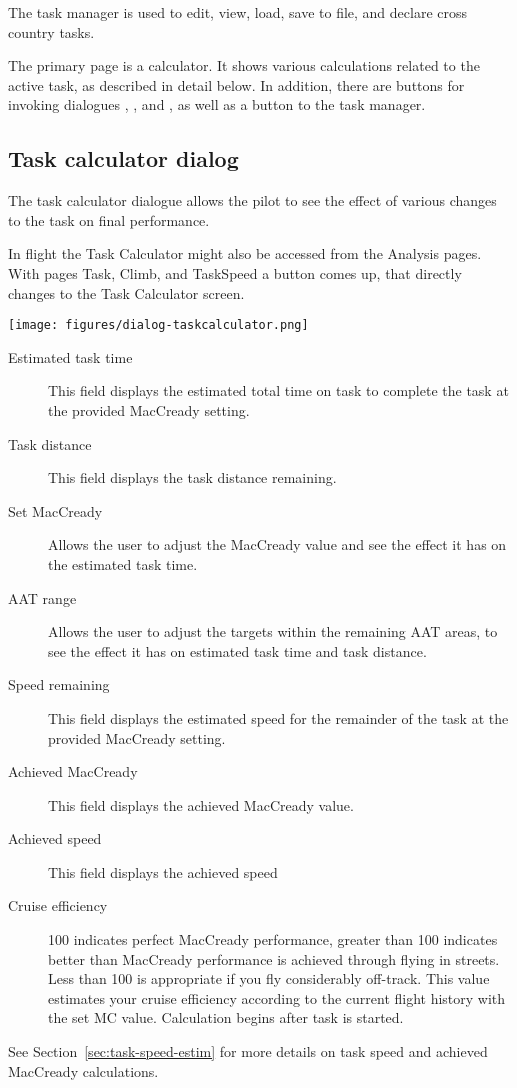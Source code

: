 The task manager is used to edit, view, load, save to file, and declare cross
country tasks.

The primary page is a calculator. It shows various calculations 
related to the active task, as described in detail below.  In addition, there 
are buttons for invoking dialogues , , 
and , as well as a button to  the task manager.

\subsection*{Task calculator dialog}\label{sec:task-calc-dial}
The task calculator dialogue allows the pilot to see the effect of
various changes to the task on final performance.

In flight the Task Calculator might also be accessed from the Analysis pages. 
With pages Task, Climb, and TaskSpeed a button  comes up, 
that directly changes to the Task Calculator screen.


\begin{center}
\texttt{[image: figures/dialog-taskcalculator.png]}
\end{center}

\begin{description}
\item[Estimated task time]  This field displays the estimated total time 
  on task to complete the task at the provided MacCready setting.
\item[Task distance]  This field displays the task distance remaining.
\item[Set MacCready]  Allows the user to adjust the MacCready value and 
  see the effect it has on the estimated task time.
\item[AAT range]  Allows the user to adjust the targets within the remaining 
  AAT areas, to see the effect it has on estimated task time and task distance.
\item[Speed remaining]  This field displays the estimated speed for the
  remainder of the task at the provided MacCready setting.
\item[Achieved MacCready]  This field displays the achieved MacCready value.
\item[Achieved speed]  This field displays the achieved speed %
\item[Cruise efficiency]  100 indicates perfect MacCready performance, greater 
than 100 indicates better than MacCready performance is achieved through flying
in streets. Less than 100 is appropriate if you fly considerably off-track. This 
value estimates your cruise efficiency according to the current flight history 
with the set MC value. Calculation begins after task is started.
\end{description}
See Section~\ref{sec:task-speed-estim} for more details on task speed
and achieved MacCready calculations.

